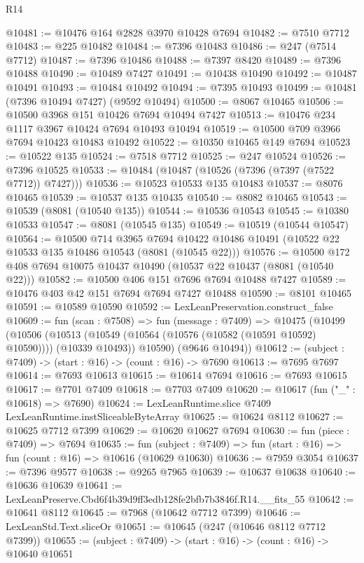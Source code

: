 \begin{lexlean}{R14}
\begin{coremodule}
@10481 := @10476 @164 @2828 @3970 @10428 @7694
@10482 := @7510 @7712
@10483 := @225 @10482
@10484 := @7396 @10483
@10486 := @247 (@7514 @7712)
@10487 := @7396 @10486
@10488 := @7397 @8420
@10489 := @7396 @10488
@10490 := @10489 @7427
@10491 := @10438 @10490
@10492 := @10487 @10491
@10493 := @10484 @10492
@10494 := @7395 @10493
@10499 := @10481 (@7396 @10494 @7427) (@9592 @10494)
@10500 := @8067 @10465
@10506 := @10500 @3968 @151 @10426 @7694 @10494 @7427
@10513 := @10476 @234 @1117 @3967 @10424 @7694 @10493 @10494
@10519 := @10500 @709 @3966 @7694 @10423 @10483 @10492
@10522 := @10350 @10465 @149 @7694
@10523 := @10522 @135
@10524 := @7518 @7712
@10525 := @247 @10524
@10526 := @7396 @10525
@10533 := @10484 (@10487 (@10526 (@7396 (@7397 (@7522 @7712)) @7427)))
@10536 := @10523 @10533 @135 @10483
@10537 := @8076 @10465
@10539 := @10537 @135 @10435
@10540 := @8082 @10465
@10543 := @10539 (@8081 (@10540 @135))
@10544 := @10536 @10543
@10545 := @10380 @10533
@10547 := @8081 (@10545 @135)
@10549 := @10519 (@10544 @10547)
@10564 := @10500
    @714
    @3965
    @7694
    @10422
    @10486
    @10491
    (@10522 @22 @10533 @135 @10486 @10543 (@8081 (@10545 @22)))
@10576 := @10500 @172 @408 @7694 @10075 @10437 @10490 (@10537 @22 @10437 (@8081 (@10540 @22)))
@10582 := @10500 @406 @151 @7696 @7694 @10488 @7427
@10589 := @10476 @403 @42 @151 @7694 @7694 @7427 @10488
@10590 := @8101 @10465
@10591 := @10589 @10590
@10592 := LexLeanPreservation.construct_false
@10609 := fun (scan : @7508) =>
  fun (message : @7409) =>
  @10475
    (@10499
      (@10506
        (@10513 (@10549 (@10564 (@10576 (@10582 (@10591 @10592) @10590)))) (@10339 @10493))
        @10590)
      (@9646 @10494))
@10612 := (subject : @7409) -> (start : @16) -> (count : @16) -> @7690
@10613 := @7695 @7697
@10614 := @7693 @10613
@10615 := @10614 @7694
@10616 := @7693 @10615
@10617 := @7701 @7409
@10618 := @7703 @7409
@10620 := @10617 (fun ("_" : @10618) => @7690)
@10624 := LexLeanRuntime.slice @7409 LexLeanRuntime.instSliceableByteArray
@10625 := @10624 @8112
@10627 := @10625 @7712 @7399
@10629 := @10620 @10627 @7694
@10630 := fun (piece : @7409) => @7694
@10635 := fun (subject : @7409) => fun (start : @16) => fun (count : @16) => @10616 (@10629 @10630)
@10636 := @7959 @3054
@10637 := @7396 @9577
@10638 := @9265 @7965
@10639 := @10637 @10638
@10640 := @10636 @10639
@10641 := LexLeanPreserve.Cbd6f4b39d9ff3edb128fe2bfb7b3846f.R14.__fits_55
@10642 := @10641 @8112
@10645 := @7968 (@10642 @7712 @7399)
@10646 := LexLeanStd.Text.sliceOr
@10651 := @10645 (@247 (@10646 @8112 @7712 @7399))
@10655 := (subject : @7409) -> (start : @16) -> (count : @16) -> @10640 @10651

\end{coremodule}
\end{lexlean}

